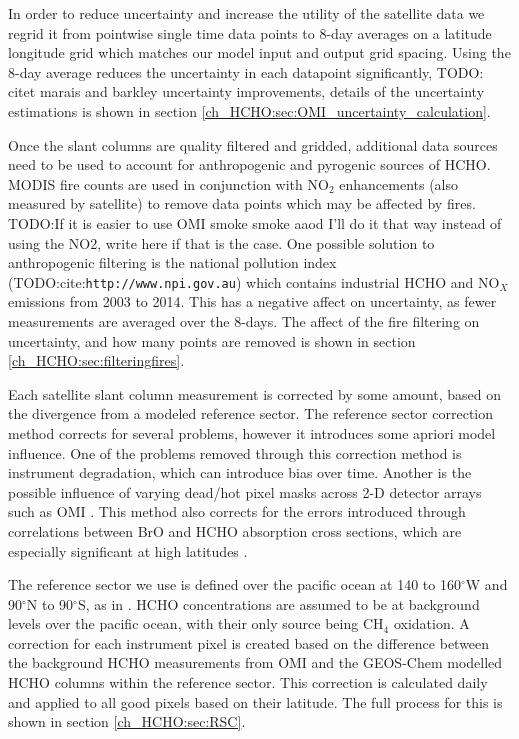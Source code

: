    In order to reduce uncertainty and increase the utility of the satellite data we regrid it from pointwise single time data points to 8-day averages on a latitude longitude grid which matches our model input and output grid spacing. 
    Using the 8-day average reduces the uncertainty in each datapoint significantly, TODO: citet marais and barkley uncertainty improvements, details of the uncertainty estimations is shown in section \ref{ch_HCHO:sec:OMI_uncertainty_calculation}.
    
    Once the slant columns are quality filtered and gridded, additional data sources need to be used to account for anthropogenic and pyrogenic sources of HCHO.
    MODIS fire counts are used in conjunction with NO$_2$ enhancements (also measured by satellite) to remove data points which may be affected by fires. 
    TODO:If it is easier to use OMI smoke smoke aaod I'll do it that way instead of using the NO2, write here if that is the case.
    One possible solution to anthropogenic filtering is the national pollution index (TODO:cite:\verb|http://www.npi.gov.au|) which contains industrial HCHO and NO$_X$ emissions from 2003 to 2014.
    This has a negative affect on uncertainty, as fewer measurements are averaged over the 8-days. 
    The affect of the fire filtering on uncertainty, and how many points are removed is shown in section \ref{ch_HCHO:sec:filteringfires}.
    
    Each satellite slant column measurement is corrected by some amount, based on the divergence from a modeled reference sector.
    The reference sector correction method corrects for several problems, however it introduces some apriori model influence.
    One of the problems removed through this correction method is instrument degradation, which can introduce bias over time.
    Another is the possible influence of varying dead/hot pixel masks across 2-D detector arrays such as OMI \citep{DeSmedt2015}.
    This method also corrects for the errors introduced through correlations between BrO and HCHO absorption cross sections, which are especially significant at high latitudes \citep{Abad2015}.
    
    The reference sector we use is defined over the pacific ocean at 140 to 160$^{\circ}$W and 90$^{\circ}$N to 90$^{\circ}$S, as in \citet{Abad2015}.
    HCHO concentrations are assumed to be at background levels over the pacific ocean, with their only source being CH$_4$ oxidation.
    A correction for each instrument pixel is created based on the difference between the background HCHO measurements from OMI and the GEOS-Chem modelled HCHO columns within the reference sector.
    This correction is calculated daily and applied to all good pixels based on their latitude.
    The full process for this is shown in section \ref{ch_HCHO:sec:RSC}.
    
